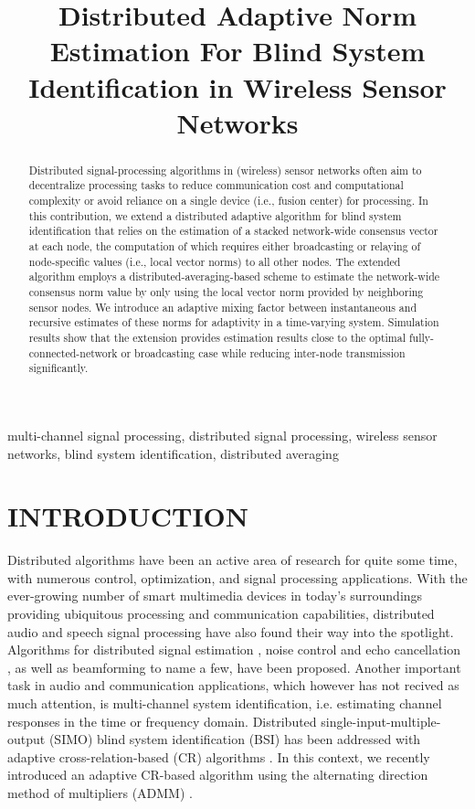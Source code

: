 \documentclass{article}
\title{Distributed Adaptive Norm Estimation For Blind System\\Identification in Wireless Sensor Networks}
\begin{document}
\ninept
%
\maketitle
%
\begin{abstract}
    Distributed signal-processing algorithms in (wireless) sensor networks often aim to decentralize processing tasks to reduce communication cost and computational complexity or avoid reliance on a single device (i.e., fusion center) for processing.
    In this contribution, we extend a distributed adaptive algorithm for blind system identification that relies on the estimation of a stacked network-wide consensus vector at each node, the computation of which requires either broadcasting or relaying of node-specific values (i.e., local vector norms) to all other nodes.
    The extended algorithm employs a distributed-averaging-based scheme to estimate the network-wide consensus norm value by only using the local vector norm provided by neighboring sensor nodes.
    We introduce an adaptive mixing factor between instantaneous and recursive estimates of these norms for adaptivity in a time-varying system.
    Simulation results show that the extension provides estimation results close to the optimal fully-connected-network or broadcasting case while reducing inter-node transmission significantly.
\end{abstract}
%
\begin{keywords}
multi-channel signal processing, distributed signal processing, wireless sensor networks, blind system identification, distributed averaging
\end{keywords}
%
\section{INTRODUCTION}
\label{sec:intro}

Distributed algorithms have been an active area of research for quite some time, with numerous control, optimization, and signal processing applications.
With the ever-growing number of smart multimedia devices in today's surroundings providing ubiquitous processing and communication capabilities, distributed audio and speech signal processing have also found their way into the spotlight.
Algorithms for distributed signal estimation \cite{5483092}, noise control and echo cancellation \cite{9670697}, as well as beamforming \cite{6663655,6329934,MARKOVICHGOLAN20154,6309434} to name a few, have been proposed.
Another important task in audio and communication applications, which however has not recived as much attention, is multi-channel system identification, i.e. estimating channel responses in the time or frequency domain.
Distributed single-input-multiple-output (SIMO) blind system identification (BSI) has been addressed with adaptive cross-relation-based (CR) algorithms \cite{yuDistributedBlindSystem2014, liuDistributedBlindIdentification2016}.
In this context, we recently introduced an adaptive CR-based algorithm \cite{blochbergerDBSI} using the alternating direction method of multipliers (ADMM) \cite{boydDistributedOptimizationStatistical2011}.
\end{document}

